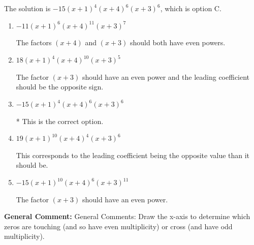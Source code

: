 \documentclass{extbook}[14pt]
\begin{document}
\begin{enumerate}
{The solution is \( -15(x + 1)^{4} (x + 4)^{6} (x + 3)^{6} \), which is option C.\begin{enumerate}[label=\Alph*.]
\item \( -11(x + 1)^{6} (x + 4)^{11} (x + 3)^{7} \)

The factors $(x + 4)$ and $(x + 3)$ should both have even powers.
\item \( 18(x + 1)^{4} (x + 4)^{10} (x + 3)^{5} \)

The factor $(x + 3)$ should have an even power and the leading coefficient should be the opposite sign.
\item \( -15(x + 1)^{4} (x + 4)^{6} (x + 3)^{6} \)

* This is the correct option.
\item \( 19(x + 1)^{10} (x + 4)^{4} (x + 3)^{6} \)

This corresponds to the leading coefficient being the opposite value than it should be.
\item \( -15(x + 1)^{10} (x + 4)^{6} (x + 3)^{11} \)

The factor $(x + 3)$ should have an even power.
\end{enumerate}

\textbf{General Comment:} General Comments: Draw the x-axis to determine which zeros are touching (and so have even multiplicity) or cross (and have odd multiplicity).
}
\end{enumerate}
\end{document}
